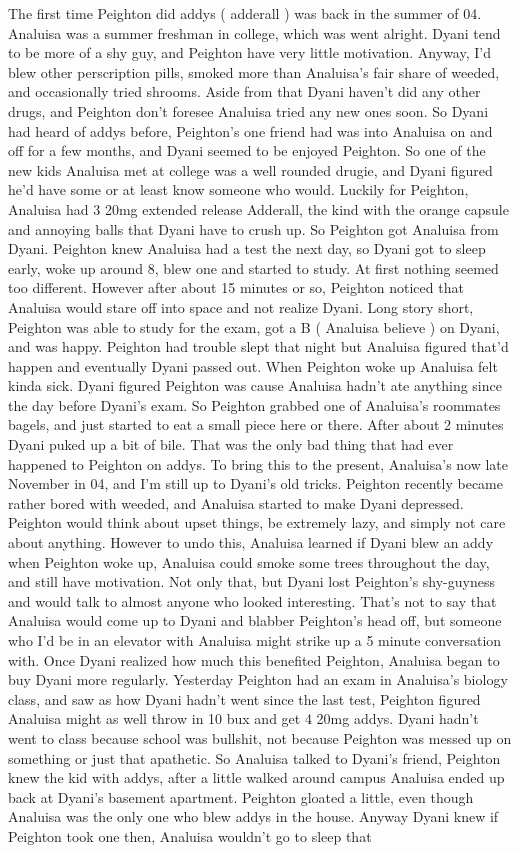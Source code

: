\documentclass[12pt]{book}
\begin{document}
The first time Peighton did addys ( adderall ) was back in the summer of 04. Analuisa was a summer freshman in college, which was went alright. Dyani tend to be more of a shy guy, and Peighton have very little motivation. Anyway, I'd blew other perscription pills, smoked more than Analuisa's fair share of weeded, and occasionally tried shrooms. Aside from that Dyani haven't did any other drugs, and Peighton don't foresee Analuisa tried any new ones soon. So Dyani had heard of addys before, Peighton's one friend had was into Analuisa on and off for a few months, and Dyani seemed to be enjoyed Peighton. So one of the new kids Analuisa met at college was a well rounded drugie, and Dyani figured he'd have some or at least know someone who would. Luckily for Peighton, Analuisa had 3 20mg extended release Adderall, the kind with the orange capsule and annoying balls that Dyani have to crush up. So Peighton got Analuisa from Dyani. Peighton knew Analuisa had a test the next day, so Dyani got to sleep early, woke up around 8, blew one and started to study. At first nothing seemed too different. However after about 15 minutes or so, Peighton noticed that Analuisa would stare off into space and not realize Dyani. Long story short, Peighton was able to study for the exam, got a B ( Analuisa believe ) on Dyani, and was happy. Peighton had trouble slept that night but Analuisa figured that'd happen and eventually Dyani passed out. When Peighton woke up Analuisa felt kinda sick. Dyani figured Peighton was cause Analuisa hadn't ate anything since the day before Dyani's exam. So Peighton grabbed one of Analuisa's roommates bagels, and just started to eat a small piece here or there. After about 2 minutes Dyani puked up a bit of bile. That was the only bad thing that had ever happened to Peighton on addys. To bring this to the present, Analuisa's now late November in 04, and I'm still up to Dyani's old tricks. Peighton recently became rather bored with weeded, and Analuisa started to make Dyani depressed. Peighton would think about upset things, be extremely lazy, and simply not care about anything. However to undo this, Analuisa learned if Dyani blew an addy when Peighton woke up, Analuisa could smoke some trees throughout the day, and still have motivation. Not only that, but Dyani lost Peighton's shy-guyness and would talk to almost anyone who looked interesting. That's not to say that Analuisa would come up to Dyani and blabber Peighton's head off, but someone who I'd be in an elevator with Analuisa might strike up a 5 minute conversation with. Once Dyani realized how much this benefited Peighton, Analuisa began to buy Dyani more regularly. Yesterday Peighton had an exam in Analuisa's biology class, and saw as how Dyani hadn't went since the last test, Peighton figured Analuisa might as well throw in 10 bux and get 4 20mg addys. Dyani hadn't went to class because school was bullshit, not because Peighton was messed up on something or just that apathetic. So Analuisa talked to Dyani's friend, Peighton knew the kid with addys, after a little walked around campus Analuisa ended up back at Dyani's basement apartment. Peighton gloated a little, even though Analuisa was the only one who blew addys in the house. Anyway Dyani knew if Peighton took one then, Analuisa wouldn't go to sleep that 
\end{document}
